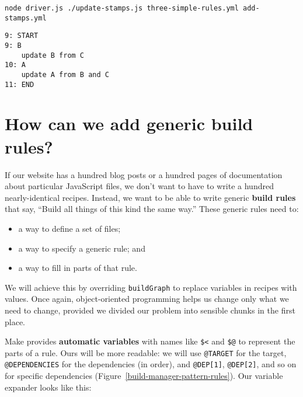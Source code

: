 \documentclass[krantzl]{krantz}
\newcommand{\figref}[1]{Figure~\ref{#1}}
\newcommand{\glossref}[1]{\textbf{#1}}
\begin{document}
\begin{lstlisting}[frame=shadowbox]
node driver.js ./update-stamps.js three-simple-rules.yml add-stamps.yml
\end{lstlisting}



\begin{lstlisting}[frame=tblr,backgroundcolor=\color{black!5}]
9: START
9: B
    update B from C
10: A
    update A from B and C
11: END
\end{lstlisting}


\section{How can we add generic build rules?}\label{build-manager-generic}


If our website has a hundred blog posts
or a hundred pages of documentation about particular JavaScript files,
we don’t want to have to write a hundred nearly-identical recipes.
Instead,
we want to be able to write generic \glossref{build rules} that say,
“Build all things of this kind the same way.”
These generic rules need to:

\begin{itemize}

\item 

a way to define a set of files;



\item 

a way to specify a generic rule;
    and



\item 

a way to fill in parts of that rule.



\end{itemize}


\noindent We will achieve this by overriding \texttt{buildGraph} to replace variables in recipes with values.
Once again,
object-oriented programming helps us change only what we need to change,
provided we divided our problem into sensible chunks in the first place.


Make provides \glossref{automatic variables}
with names like \texttt{\$<} and \texttt{\$@}
to represent the parts of a rule.
Ours will be more readable:
we will use \texttt{@TARGET} for the target,
\texttt{@DEPENDENCIES} for the dependencies (in order),
and \texttt{@DEP[1]}, \texttt{@DEP[2]}, and so on for specific dependencies
(\figref{build-manager-pattern-rules}).
Our variable expander looks like this:
\end{document}
